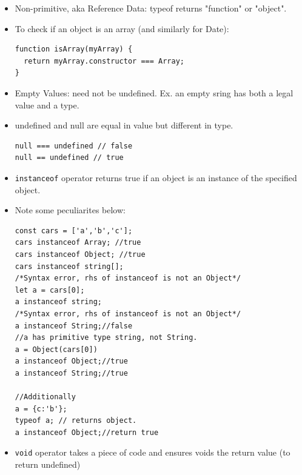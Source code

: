 \documentclass{report}
\begin{document}
\begin{itemize}
\item Non-primitive, aka Reference Data: typeof returns "function" or "object".
\item To check if an object is an array (and similarly for Date):
\begin{lstlisting}
function isArray(myArray) {
  return myArray.constructor === Array;
}
\end{lstlisting}
\item Empty Values: need not be undefined. Ex. an empty sring has both a legal value and a type.
\item undefined and null are equal in value but different in type.
\begin{lstlisting}
null === undefined // false
null == undefined // true
\end{lstlisting}
\item \texttt{instanceof} operator returns true if an object is an instance of the specified object.
\item Note some peculiarites below:
\begin{lstlisting}
const cars = ['a','b','c'];
cars instanceof Array; //true
cars instanceof Object; //true
cars instanceof string[];
/*Syntax error, rhs of instanceof is not an Object*/
let a = cars[0];
a instanceof string;
/*Syntax error, rhs of instanceof is not an Object*/
a instanceof String;//false
//a has primitive type string, not String.
a = Object(cars[0])
a instanceof Object;//true
a instanceof String;//true

//Additionally
a = {c:'b'};
typeof a; // returns object.
a instanceof Object;//return true 
\end{lstlisting}
\item \texttt{void} operator takes a piece of code and ensures voids the return value (to return undefined)
\end{itemize}
\end{document}
